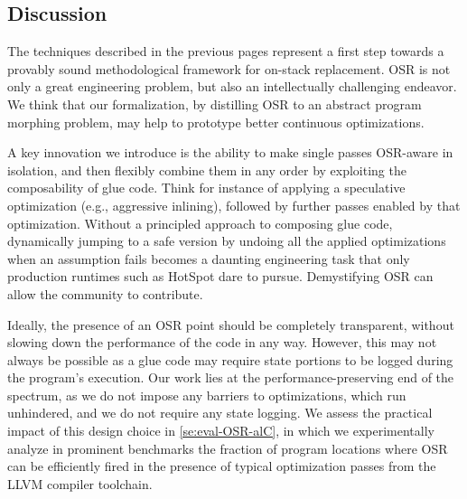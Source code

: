 





\subsection{Discussion}
The techniques described in the previous pages represent a first step towards a provably sound methodological framework for on-stack replacement. OSR is not only a great engineering problem, but also an intellectually challenging endeavor. We think that our formalization, by distilling OSR to an abstract program morphing problem, may help to prototype better continuous optimizations.

A key innovation we introduce is the ability to make single passes OSR-aware in isolation, and then flexibly combine them in any order by exploiting the composability of glue code. Think for instance of applying a speculative optimization (e.g., aggressive inlining), followed by further passes enabled by that optimization. Without a principled approach to composing glue code, dynamically jumping to a safe version by undoing all the applied optimizations when an assumption fails becomes a daunting engineering task that only production runtimes such as HotSpot dare to pursue. Demystifying OSR can allow the community to contribute.

Ideally, the presence of an OSR point should be completely transparent, without slowing down the performance of the code in any way. However, this may not always be possible as a glue code may require state portions to be logged during the program's execution. Our work lies at the performance-preserving end of the spectrum, as we do not impose any barriers to optimizations, which run unhindered, and we do not require any state logging. We assess the practical impact of this design choice in \mysection\ref{se:eval-OSR-alC}, in which we experimentally analyze in prominent benchmarks the fraction of program locations where OSR can be efficiently fired in the presence of typical optimization passes from the LLVM compiler toolchain.


